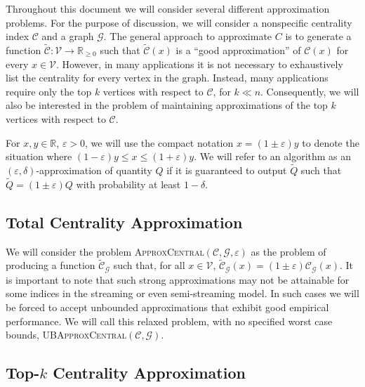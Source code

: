 \documentclass[10]{report}
\newcommand{\algoname}[1]{\textnormal{\textsc{#1}}}
\begin{document}
Throughout this document we will consider several different approximation problems. 
For the purpose of discussion, we will consider a nonspecific centrality index $\mathcal{C}$ and a graph $\mathcal{G}$.
The general approach to approximate $C$ is to generate a function $\widetilde{\mathcal{C}}: \mathcal{V} \rightarrow \mathbb{R}_{\geq 0}$ such that $\widetilde{\mathcal{C}}(x)$ is a ``good approximation'' of $\mathcal{C}(x)$ for every $x \in \mathcal{V}$. 
However, in many applications it is not necessary to exhaustively list the centrality for every vertex in the graph. 
Instead, many applications require only the top $k$ vertices with respect to $\mathcal{C}$, for $k \ll n$. 
Consequently, we will also be interested in the problem of maintaining approximations of the top $k$ vertices with respect to $\mathcal{C}$. 

For $x,y \in \mathbb{R}$, $\varepsilon > 0$, we will use the compact notation $x = (1 \pm \varepsilon)y$ to denote the situation where $(1-\varepsilon)y \leq x \leq (1+\varepsilon)y$. 
We will refer to an algorithm as an $(\varepsilon, \delta)$-approximation of quantity $Q$ if it is guaranteed to output $\widetilde{Q}$ such that $\widetilde{Q} = (1\pm \varepsilon)Q$ with probability at least $1-\delta$. 


\subsection{Total Centrality Approximation} \label{sec:approx:all}

We will consider the problem \algoname{ApproxCentral}$(\mathcal{C}, \mathcal{G}, \varepsilon)$ as the problem of producing a function $\widetilde{\mathcal{C}}_\mathcal{G}$ such that, for all $x \in \mathcal{V}$, $\widetilde{\mathcal{C}}_\mathcal{G}(x) = (1 \pm \varepsilon)\mathcal{C}_\mathcal{G}(x)$. 
It is important to note that such strong approximations may not be attainable for some indices in the streaming or even semi-streaming model. 
In such cases we will be forced to accept unbounded approximations that exhibit good empirical performance. 
We will call this relaxed problem, with no specified worst case bounds, \algoname{UBApproxCentral}$(\mathcal{C}, \mathcal{G})$. 


\subsection{Top-$k$ Centrality Approximation} \label{sec:approx:topk}
\end{document}
